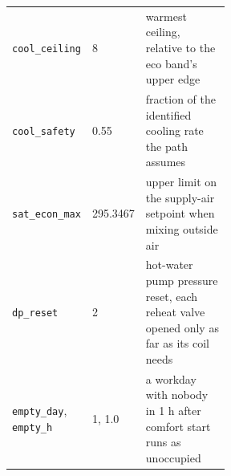 \documentclass{article}
\begin{document}
\begin{table}[H]
\begin{tabular}{llp{0.54\linewidth}}
\texttt{cool\_ceiling} & 8 & warmest ceiling, relative to the eco band's upper edge\\
\texttt{cool\_safety} & 0.55 & fraction of the identified cooling rate the path assumes\\
\texttt{sat\_econ\_max} & 295.3467 & upper limit on the supply-air setpoint when mixing outside air\\
\texttt{dp\_reset} & 2 & hot-water pump pressure reset, each reheat valve opened only as far as its coil needs\\
\texttt{empty\_day}, \texttt{empty\_h} & 1, 1.0 & a workday with nobody in 1 h after comfort start runs as unoccupied\\\bottomrule
\end{tabular}
\end{table}
\end{document}
